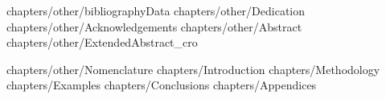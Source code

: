 \documentclass[oneside,a4paper,12pt,final]{bk}
\begin{document}
\setlength{\pltopsep}{-8pt}
\setlength{\plpartopsep}{-6pt}
\setlength{\plitemsep}{-4pt}
\setlength{\plparsep}{-3pt}
\renewcommand{\arraycolsep}{3pt}
\setlength\pltopsep{9pt}
\setlength\plpartopsep{3pt}
\setlength\plitemsep{5pt}
\newbox\boxa
\newbox\boxb
\newbox\boxc
\newbox\boxd
{}
\newlength\savedwidth
\newcommand\whline{
	\noalign
	{
		\global\savedwidth\arrayrulewidth
		\global\arrayrulewidth 1pt
	}
  \hline
  \noalign{\global\arrayrulewidth\savedwidth}
}
%
%
\pagestyle{headings}
%
%
\maketitle
%
 {chapters/other/bibliographyData}
%
 {chapters/other/Dedication}
%
 {chapters/other/Acknowledgements}                
%
 {chapters/other/Abstract}       
%
 {chapters/other/ExtendedAbstract_cro}       
%              
%
%
\tableofcontents
%
\listoffigures
%
\listoftables
%
\begingroup
\markboth{}{}
 {chapters/other/Nomenclature}       
\endgroup
%
%
%
%
\newpage
%
%
 {chapters/Introduction} 
%
%
 {chapters/Methodology}
%
%
 {chapters/Examples}
%
%
%
 {chapters/Conclusions}
%
%
%
 {chapters/Appendices}
%
\end{document}
